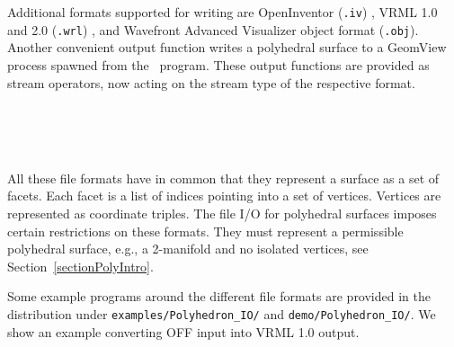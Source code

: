 Additional formats supported for writing are OpenInventor ({\tt .iv})
\cite{cgal:w-impoo-94}, VRML 1.0 and 2.0 ({\tt .wrl})
\cite{cgal:bpp-vrml-95,cgal:vrmls-96,cgal:hw-vrml2h-96}, and Wavefront Advanced
Visualizer object format ({\tt .obj}). Another convenient output
function writes a polyhedral surface to a GeomView process spawned
from the \cgal\ program.  These output functions are provided as
stream operators, now acting on the stream type of the respective
format.

\\
\\
\\

\ccHtmlNoLinks
{}

\ccHtmlNoLinks
{}

\ccHtmlNoLinks
{}

\ccHtmlNoLinks
{}


All these file formats have in common that they represent a surface as
a set of facets. Each facet is a list of indices pointing into a set
of vertices. Vertices are represented as coordinate triples. The
file I/O for polyhedral surfaces  imposes certain 
restrictions on these formats. They must represent a permissible 
polyhedral surface, e.g., a 2-manifold and no isolated vertices, see 
Section~\ref{sectionPolyIntro}.

Some example programs around the different file formats are provided
in the distribution under \texttt{examples/Polyhedron\_IO/} and
\texttt{demo/Polyhedron\_IO/}. We show an example converting OFF input
into VRML 1.0 output.

